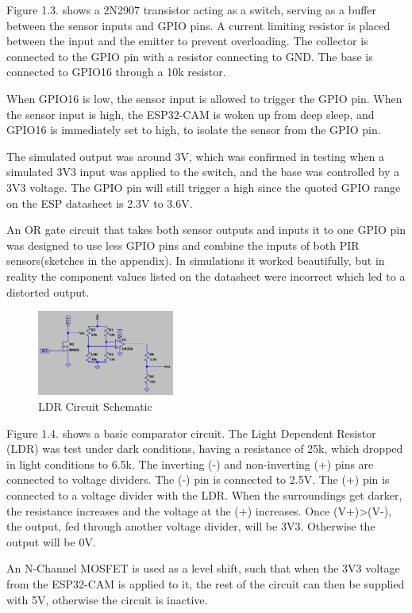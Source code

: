 Figure 1.3. shows a 2N2907 transistor acting as a switch, serving as a buffer between the sensor inputs and GPIO pins. A current limiting resistor is placed between the input and the emitter to prevent overloading. The collector is connected to the GPIO pin with a resistor connecting to GND. The base is connected to GPIO16 through a 10k resistor. 

When GPIO16 is low, the sensor input is allowed to trigger the GPIO pin. When the sensor input is high, the ESP32-CAM is woken up from deep sleep, and GPIO16 is immediately set to high, to isolate the sensor from the GPIO pin. 

The simulated output was around 3V, which was confirmed in testing when a simulated 3V3 input was applied to the switch, and the base was controlled by a 3V3 voltage. The GPIO pin will still trigger a high since the quoted GPIO range on the ESP datasheet is 2.3V to 3.6V. 

An OR gate circuit that takes both sensor outputs and inputs it to one GPIO pin was designed to use less GPIO pins and combine the inputs of both PIR sensors(sketches in the appendix). In simulations it worked beautifully, but in reality the component values listed on the datasheet were incorrect which led to a distorted output. 

\begin{figure}[h]
\centering
\includegraphics[width=0.4\textwidth]{Images/LDR_circuit.png}
\caption{LDR Circuit Schematic}
\label{fig:my_label}
\end{figure}

Figure 1.4. shows a basic comparator circuit. The Light Dependent Resistor (LDR) was test under dark conditions, having a resistance of 25k, which dropped in light conditions to 6.5k. The inverting (-) and non-inverting (+) pins are connected to voltage dividers. The (-) pin is connected to 2.5V. The (+) pin is connected to a voltage divider with the LDR. When the surroundings get darker, the resistance increases and the voltage at the (+) increases. Once (V+)>(V-), the output, fed through another voltage divider, will be 3V3. Otherwise the output will be 0V. 

An N-Channel MOSFET is used as a level shift, such that when the 3V3 voltage from the ESP32-CAM is applied to it, the rest of the circuit can then be supplied with 5V, otherwise the circuit is inactive.

